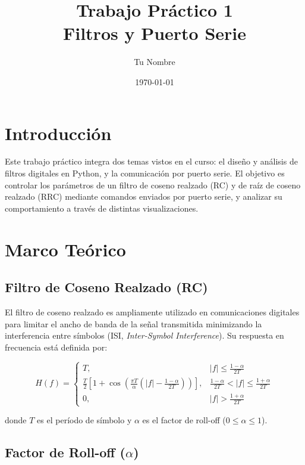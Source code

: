 \documentclass[12pt, a4paper]{article}
\title{Trabajo Práctico 1 \\ Filtros y Puerto Serie}
\author{Tu Nombre}
\date{\today}
\begin{document}
\maketitle
\tableofcontents
\newpage

\section{Introducción}

Este trabajo práctico integra dos temas vistos en el curso: el diseño y análisis
de filtros digitales en Python, y la comunicación por puerto serie. El objetivo
es controlar los parámetros de un filtro de coseno realzado (RC) y de raíz de
coseno realzado (RRC) mediante comandos enviados por puerto serie, y analizar
su comportamiento a través de distintas visualizaciones.

\section{Marco Teórico}

\subsection{Filtro de Coseno Realzado (RC)}

El filtro de coseno realzado es ampliamente utilizado en comunicaciones digitales
para limitar el ancho de banda de la señal transmitida minimizando la interferencia
entre símbolos (ISI, \textit{Inter-Symbol Interference}). Su respuesta en frecuencia
está definida por:

\begin{equation}
H(f) =
\begin{cases}
T, & |f| \leq \frac{1-\alpha}{2T} \\
\frac{T}{2}\left[1 + \cos\left(\frac{\pi T}{\alpha}\left(|f| - \frac{1-\alpha}{2T}\right)\right)\right], & \frac{1-\alpha}{2T} < |f| \leq \frac{1+\alpha}{2T} \\
0, & |f| > \frac{1+\alpha}{2T}
\end{cases}
\end{equation}

donde $T$ es el período de símbolo y $\alpha$ es el factor de roll-off
($0 \leq \alpha \leq 1$).

\subsection{Factor de Roll-off ($\alpha$)}
\end{document}
